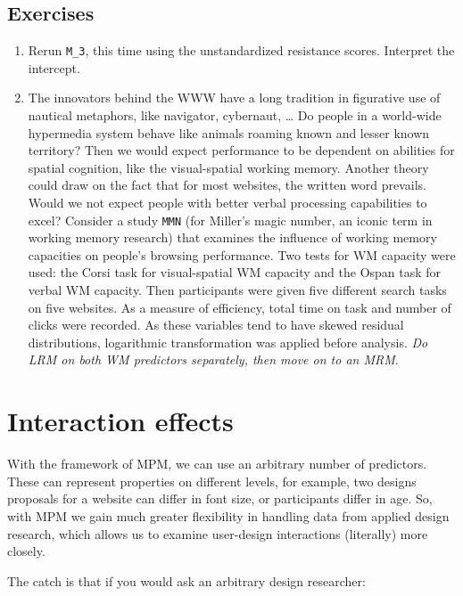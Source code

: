 \documentclass[]{svmono}
\begin{document}
\subsection{Exercises}\label{exercises-4}

\begin{enumerate}
\def\labelenumi{\arabic{enumi}.}
\item
  Rerun \texttt{M\_3}, this time using the unstandardized resistance
  scores. Interpret the intercept.
\item
  The innovators behind the WWW have a long tradition in figurative use
  of nautical metaphors, like navigator, cybernaut, \ldots{} Do people
  in a world-wide hypermedia system behave like animals roaming known
  and lesser known territory? Then we would expect performance to be
  dependent on abilities for spatial cognition, like the visual-spatial
  working memory. Another theory could draw on the fact that for most
  websites, the written word prevails. Would we not expect people with
  better verbal processing capabilities to excel? Consider a study
  \texttt{MMN} (for Miller's magic number, an iconic term in working
  memory research) that examines the influence of working memory
  capacities on people's browsing performance. Two tests for WM capacity
  were used: the Corsi task for visual-spatial WM capacity and the Ospan
  task for verbal WM capacity. Then participants were given five
  different search tasks on five websites. As a measure of efficiency,
  total time on task and number of clicks were recorded. As these
  variables tend to have skewed residual distributions, logarithmic
  transformation was applied before analysis. \emph{Do LRM on both WM
  predictors separately, then move on to an MRM}.
\end{enumerate}

\section{Interaction effects}\label{interaction-effects}

With the framework of MPM, we can use an arbitrary number of predictors.
These can represent properties on different levels, for example, two
designs proposals for a website can differ in font size, or participants
differ in age. So, with MPM we gain much greater flexibility in handling
data from applied design research, which allows us to examine
user-design interactions (literally) more closely.

The catch is that if you would ask an arbitrary design researcher:
\end{document}
